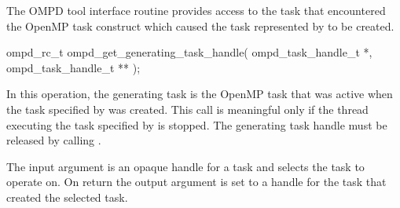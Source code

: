 %

\label{subsubsubsec:ompd_get_generating_task_handle}
\summary
The OMPD tool interface routine  provides access to 
the task that encountered the OpenMP task construct which caused the task represented by 
 to be created.

\format

\begin{cspecific}
\begin{ompSyntax}
ompd_rc_t ompd_get_generating_task_handle(
  ompd_task_handle_t *,
  ompd_task_handle_t **
);
\end{ompSyntax}
\end{cspecific}


\descr

In this operation, the generating task is the OpenMP task that was active when
the task specified by  was created. This call is meaningful only if the 
thread executing the task specified
by   is stopped. The generating task handle must be released by calling
.

\argdesc
The input argument  is an opaque handle for a task and selects the task to operate on.
On return the output argument  is set to a handle for the task
that created the selected task.

